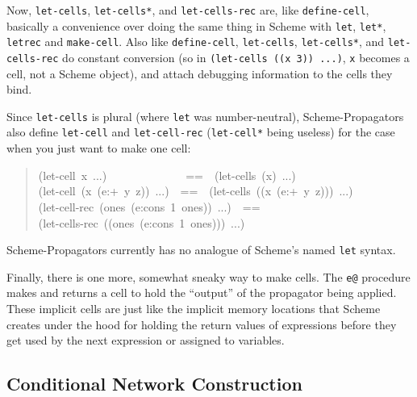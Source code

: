 \documentclass[12pt,letterpaper,english]{article}
\begin{document}
Now, \texttt{let-cells}, \texttt{let-cells*}, and \texttt{let-cells-rec} are, like
\texttt{define-cell}, basically a convenience over doing the same thing in
Scheme with \texttt{let}, \texttt{let*}, \texttt{letrec} and \texttt{make-cell}.  Also
like \texttt{define-cell}, \texttt{let-cells}, \texttt{let-cells*}, and
\texttt{let-cells-rec} do constant conversion (so in \texttt{(let-cells ((x 3)) ...)},
\texttt{x} becomes a cell, not a Scheme object), and attach
debugging information to the cells they bind.

Since \texttt{let-cells} is plural (where \texttt{let} was number-neutral),
Scheme-Propagators also define \texttt{let-cell} and \texttt{let-cell-rec}
(\texttt{let-cell*} being useless) for the case when you just want to make
one cell:
\begin{quote}{\ttfamily \raggedright \noindent
(let-cell~x~...)~~~~~~~~~~~~~~==~~(let-cells~(x)~...)~\\
(let-cell~(x~(e:+~y~z))~...)~~==~~(let-cells~((x~(e:+~y~z)))~...)~\\
(let-cell-rec~(ones~(e:cons~1~ones))~...)~~==~\\
(let-cells-rec~((ones~(e:cons~1~ones)))~...)
}\end{quote}

Scheme-Propagators currently has no analogue of Scheme's named \texttt{let}
syntax.

Finally, there is one more, somewhat sneaky way to make cells.
The \texttt{e@}
procedure makes and returns a cell to hold the ``output'' of the
propagator being applied.  These implicit cells are just
like the implicit memory locations that Scheme creates under the hood
for holding the return values of expressions before they get used by
the next expression or assigned to variables.



\subsection{Conditional Network Construction}
\label{conditional-network-construction}
\end{document}

